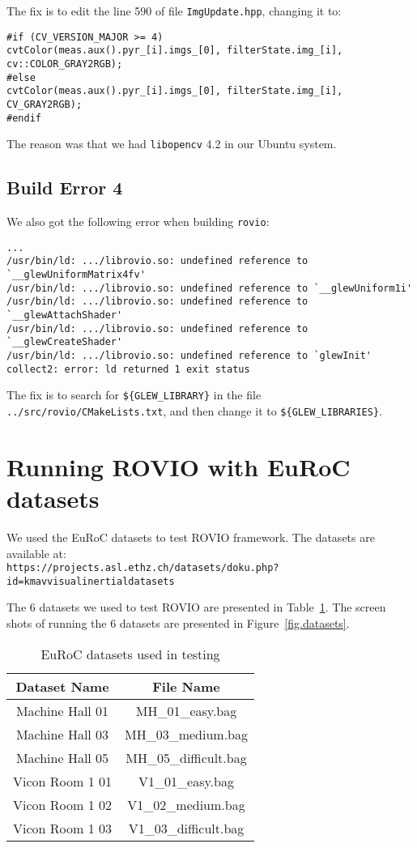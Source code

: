 \documentclass[11pt, oneside]{article}   	%
\begin{document}
The fix is to edit the line 590 of file \verb+ImgUpdate.hpp+, changing
it to:
\begin{verbatim}
#if (CV_VERSION_MAJOR >= 4)
cvtColor(meas.aux().pyr_[i].imgs_[0], filterState.img_[i], cv::COLOR_GRAY2RGB);
#else
cvtColor(meas.aux().pyr_[i].imgs_[0], filterState.img_[i], CV_GRAY2RGB);
#endif
\end{verbatim}
The reason was that we had \verb+libopencv+ 4.2 in our Ubuntu system.


\subsection{Build Error 4}
We also got the following error when building \verb+rovio+:
\begin{verbatim}
...
/usr/bin/ld: .../librovio.so: undefined reference to `__glewUniformMatrix4fv'
/usr/bin/ld: .../librovio.so: undefined reference to `__glewUniform1i'
/usr/bin/ld: .../librovio.so: undefined reference to `__glewAttachShader'
/usr/bin/ld: .../librovio.so: undefined reference to `__glewCreateShader'
/usr/bin/ld: .../librovio.so: undefined reference to `glewInit'
collect2: error: ld returned 1 exit status
\end{verbatim}

The fix is to search for  \verb+${GLEW_LIBRARY}+  in the file
\verb+../src/rovio/CMakeLists.txt+, and then change it to
\verb+${GLEW_LIBRARIES}+.


\section{Running ROVIO with EuRoC datasets}
We used the EuRoC datasets to test ROVIO framework. The datasets are
available at:\\
\verb+https://projects.asl.ethz.ch/datasets/doku.php?id=kmavvisualinertialdatasets+

The 6 datasets we used to test ROVIO are presented in
Table~\ref{tab.datasets}. The screen shots of running the 6 datasets
are presented in Figure~\ref{fig.datasets}.
\begin{table}[ht]
  \centering
  \begin{tabular}{|c|c|}
    \hline
    Dataset Name & File Name \\
    \hline
    \hline
    Machine Hall 01 & MH\_01\_easy.bag \\
    \hline
    Machine Hall 03 & MH\_03\_medium.bag \\
    \hline
    Machine Hall 05 & MH\_05\_difficult.bag \\
    \hline
    Vicon Room 1 01 & V1\_01\_easy.bag\\
    \hline
    Vicon Room 1 02 & V1\_02\_medium.bag\\
    \hline
    Vicon Room 1 03 & V1\_03\_difficult.bag\\
    \hline
  \end{tabular}
  \caption{EuRoC datasets used in testing}
  \label{tab.datasets}
  \end{table}
\end{document}
